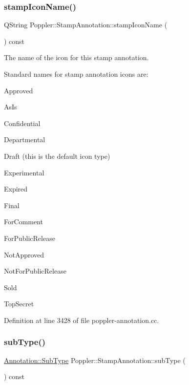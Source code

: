 \subsubsection{\texorpdfstring{stamp\+Icon\+Name()}{stampIconName()}}
{\footnotesize\ttfamily Q\+String Poppler\+::\+Stamp\+Annotation\+::stamp\+Icon\+Name (\begin{DoxyParamCaption}{ }\end{DoxyParamCaption}) const}

The name of the icon for this stamp annotation.

Standard names for stamp annotation icons are\+:
\begin{DoxyItemize}
\item Approved
\item As\+Is
\item Confidential
\item Departmental
\item Draft (this is the default icon type)
\item Experimental
\item Expired
\item Final
\item For\+Comment
\item For\+Public\+Release
\item Not\+Approved
\item Not\+For\+Public\+Release
\item Sold
\item Top\+Secret 
\end{DoxyItemize}

Definition at line 3428 of file poppler-\/annotation.\+cc.

\mbox{\label{class_poppler_1_1_stamp_annotation_ad4140dc18ea7dfc4b844afc1d0abdf74}} 
\subsubsection{\texorpdfstring{sub\+Type()}{subType()}}
{\footnotesize\ttfamily \hyperlink{class_poppler_1_1_annotation_a2d592999c330949d64679cfa9e81113f}{Annotation\+::\+Sub\+Type} Poppler\+::\+Stamp\+Annotation\+::sub\+Type (\begin{DoxyParamCaption}{ }\end{DoxyParamCaption}) const\hspace{0.3cm}{\ttfamily [virtual]}}

